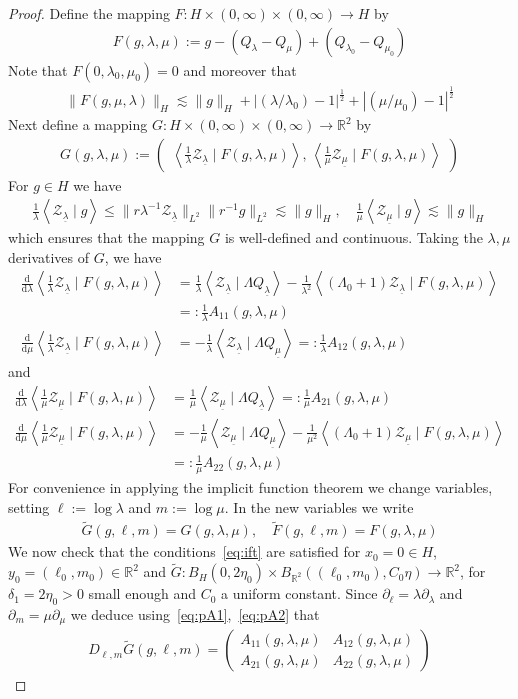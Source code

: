 \documentclass[10pt,reqno]{amsart}
\newcommand{\ZZ}{\mathcal{Z}}
\newcommand{\R}{\mathbb{R}}
\newcommand{\de}{\delta}
\newcommand{\la}{\lambda}
\newcommand{\La}{\Lambda}
\newcommand{\p}{\partial}
\newcommand{\ti}{\widetilde}
\newcommand{\U}{\underline}
\newcommand{\ang}[1]{\left\langle{#1}\right\rangle}
\newcommand{\abs}[1]{\left\lvert{#1}\right\rvert}
\newcommand{\EQ}[1]{\begin{equation}\begin{split} #1 \end{split}\end{equation}}
\newcommand{\pmat}[1]{\begin{pmatrix} #1 \end{pmatrix}}
\numberwithin{equation}{section}
\theoremstyle{remark}
\newcommand{\ula}{\underline{\lambda}}
\newcommand{\umu}{\underline{\mu}}
\newcommand{\ud}{\mathrm{d}}
\newcommand{\0}{\emptyset}
\begin{document}
\begin{proof}
Define the mapping 
$
F: H \times (0, \infty) \times (0, \infty) \to H$ by 
\EQ{
F( g, \la, \mu) :=  g - (Q_{\la} - Q_\mu)  + (Q_{\la_0} - Q_{\mu_0})
}
Note that $F(0, \la_0, \mu_0) = 0$ and moreover that 
\EQ{ \label{eq:FH}
\| F( g, \mu, \la) \|_{H} \lesssim  \|g \|_{H} + \abs{(\la/\la_0)-1}^{\frac{1}{2}} + \abs{( \mu/ \mu_0) - 1}^{\frac{1}{2}} 
}
Next define a mapping $G: H \times (0, \infty) \times (0, \infty) \to \R^2$  by 
\EQ{
G(g, \la, \mu)  :=  \pmat{ \ang{ \frac{1}{\la} \ZZ_{\ula} \mid F(g, \la, \mu)} , \, \ang{ \frac{1}{\mu} \ZZ_{\U\mu}  \mid F(g, \la, \mu)} }
}
For $g \in H$ we have 
\EQ{
\frac{1}{\la}\ang{  \ZZ_{\ula}  \mid g } \le \| r\la^{-1} \ZZ_{\ula} \|_{L^2} \| r^{-1} g \|_{L^2} \lesssim   \|g \|_H , \quad
\frac{1}{\mu}\ang{ \ZZ_{\U\mu}  \mid g } \lesssim  \|g \|_H
}
which ensures that the mapping $G$ is well-defined and continuous. Taking the $\la, \mu$ derivatives of $G$, we have 
\EQ{ \label{eq:pA1} 
\frac{\ud}{ \ud \la} \ang{ \frac{1}{\lambda}\ZZ_{\ula} \mid F(g, \la, \mu)} &=  \frac{1}{\la}\ang{ \ZZ_{\ula} \mid \La Q_{\ula}} - \frac{1}{\la^2} \ang{ (\La_0+1) \ZZ_{\ula} \mid F(g, \la, \mu)} \\
&  =: \frac{1}{\la} A_{11}(g, \la, \mu)\\
\frac{\ud}{ \ud \mu} \ang{\frac{1}{\lambda}\ZZ_{\ula} \mid F(g, \la, \mu)} &=  -\frac{1}{\la} \ang{  \ZZ_{\ula} \mid \La Q_{\umu}} =: \frac{1}{\la} A_{1 2}(g, \la,\mu)  
}
and 
\EQ{\label{eq:pA2}
\frac{\ud}{ \ud \la} \ang{ \frac{1}{\mu}\ZZ_{\umu} \mid F(g, \la, \mu)} &= \frac{1}{\mu} \ang{ \ZZ_{\umu} \mid \La Q_{\ula}} =: \frac{1}{\mu} A_{2 1}(g, \la, \mu) \\
\frac{\ud}{ \ud \mu} \ang{ \frac{1}{\mu}\ZZ_{\umu} \mid F(g, \la, \mu)} &=  - \frac{1}{\mu} \ang{ \ZZ_{\umu} \mid \La Q_{\umu}} - \frac{1}{\mu^2} \ang{ (\La_0+1) \ZZ_{\umu} \mid F(g, \la, \mu)}  \\
&=:  \frac{1}{\mu} A_{22} (g, \la, \mu)
}
For convenience in applying the implicit function theorem we change variables, setting $\ell := \log \la$ and $m := \log \mu$. In the new variables we write 
\EQ{
\ti G( g,  \ell, m) = G( g, \la,\mu), \quad \ti F ( g, \ell, m) = F(g, \la, \mu)
}
We now check that the conditions~\eqref{eq:ift} are satisfied for $x_0 = 0 \in H$, $y_0 = (\ell_0, m_0) \in \R^2$ and $\ti G: B_H(0, 2 \eta_0) \times  B_{\R^2}( (\ell_0, m_0), C_0\eta) \to \R^2$, for $ \de_1 = 2\eta_0>0$ small enough and $C_0$ a uniform constant.  Since $\p_\ell = \la \p_\la$ and $\p_m = \mu \p_\mu$ we deduce using~\eqref{eq:pA1},~\eqref{eq:pA2} that 
\EQ{
D_{\ell, m} \ti G( g,  \ell, m) = \pmat{ A_{11}(g, \la, \mu) & A_{12}(g,\la, \mu) \\ A_{21}(g, \la, \mu) & A_{22}(g, \la, \mu)}
}


\end{proof}
\end{document}
